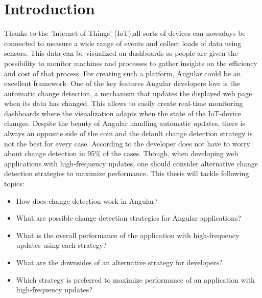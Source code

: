 
\section{Introduction} %
\label{sec:introductie}

Thanks to the 'Internet of Things' (IoT),all sorts of devices can nowadays be connected to measure a wide range of events and collect loads of data using sensors. This data can be visualized on dashboards so people are given the possibility to monitor machines and processes to gather insights on the efficiency and cost of that process. For creating such a platform, Angular could be an excellent framework. One of the key features Angular developers love is the automatic change detection, a mechanism that updates the displayed web page when its data has changed. This allows to easily create real-time monitoring dashboards where the visualization adapts when the state of the IoT-device changes. Despite the beauty of Angular handling automatic updates, there is always an opposite side of the coin and the default change detection strategy is not the best for every case.
According to \textcite{University2020} the developer does not have to worry about change detection in 95\% of the cases. Though, when developing web applications with high-frequency updates, one should consider alternative change detection strategies to maximize performance.
This thesis will tackle following topics:

\begin{itemize}
  \item How does change detection work in Angular?
  \item What are possible change detection strategies for Angular applications?
  \item What is the overall performance of the application with high-frequency updates using each strategy?
  \item What are the downsides of an alternative strategy for developers?
  \item Which strategy is preferred to maximize performance of an application with high-frequency updates?
\end{itemize}


